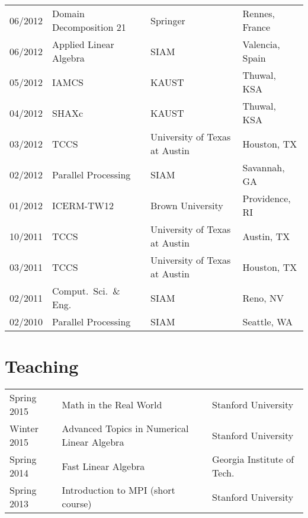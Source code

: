 \documentclass[letterpaper]{article}
\renewenvironment{itemize}{
  \begin{list}{}{
    \setlength{\leftmargin}{1.5em}
  }
}{
  \end{list}
}
\begin{document}
\begin{tabular}{rlll}
06/2012 & Domain Decomposition 21         & Springer                      & Rennes, France \\
06/2012 & Applied Linear Algebra          & SIAM                          & Valencia, Spain \\
05/2012 & IAMCS                           & KAUST                         & Thuwal, KSA \\
04/2012 & SHAXc                           & KAUST                         & Thuwal, KSA \\
03/2012 & TCCS                            & University of Texas at Austin & Houston, TX \\
02/2012 & Parallel Processing             & SIAM                          & Savannah, GA \\
01/2012 & ICERM-TW12                      & Brown University              & Providence, RI \\
10/2011 & TCCS                            & University of Texas at Austin & Austin, TX \\
03/2011 & TCCS                            & University of Texas at Austin & Houston, TX \\
02/2011 & Comput.\ Sci.\ \& Eng.\         & SIAM                          & Reno, NV \\
02/2010 & Parallel Processing             & SIAM                          & Seattle, WA \\
\end{tabular}

\section*{Teaching}
\begin{tabular}{lll}
Spring 2015 & Math in the Real World                      & Stanford University \\
Winter 2015 & Advanced Topics in Numerical Linear Algebra & Stanford University \\
Spring 2014 & Fast Linear Algebra                         & Georgia Institute of Tech.\ \\
Spring 2013 & Introduction to MPI (short course)          & Stanford University \\
\end{tabular}

\end{document}

